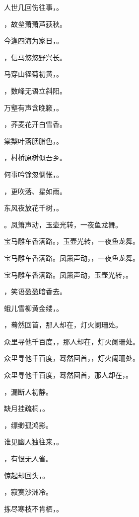 \documentclass[12pt, a4paper, addpoints, answers]{exam}
\begin{document}
\begin{questions}
\question[3] 人世几回伤往事，\fillin。

\question[3] \fillin，故垒萧萧芦荻秋。

\question[3] 今逢四海为家日，\fillin。

\question[3] \fillin，信马悠悠野兴长。

\question[3] 马穿山径菊初黄，\fillin。

\question[3] \fillin，数峰无语立斜阳。

\question[3] 万壑有声含晚籁，\fillin。

\question[3] \fillin，荞麦花开白雪香。

\question[3] 棠梨叶落胭脂色，\fillin。

\question[3] \fillin，村桥原树似吾乡。

\question[3] 何事吟馀忽惆怅，\fillin。

\question[3] \fillin，更吹落、星如雨。

\question[3] 东风夜放花千树，\fillin。

\question[3] \fillin。凤箫声动，玉壶光转，一夜鱼龙舞。

\question[3] 宝马雕车香满路。\fillin，玉壶光转，一夜鱼龙舞。

\question[3] 宝马雕车香满路。凤箫声动，\fillin，一夜鱼龙舞。

\question[3] 宝马雕车香满路。凤箫声动，玉壶光转，\fillin。

\question[3] \fillin，笑语盈盈暗香去。

\question[3] 蛾儿雪柳黄金缕，\fillin。

\question[3] \fillin，蓦然回首，那人却在，灯火阑珊处。

\question[3] 众里寻他千百度，\fillin，那人却在，灯火阑珊处。

\question[3] 众里寻他千百度，蓦然回首，\fillin，灯火阑珊处。

\question[3] 众里寻他千百度，蓦然回首，那人却在，\fillin。

\question[3] \fillin，漏断人初静。

\question[3] 缺月挂疏桐，\fillin。

\question[3] \fillin，缥缈孤鸿影。

\question[3] 谁见幽人独往来，\fillin。

\question[3] \fillin，有恨无人省。

\question[3] 惊起却回头，\fillin。

\question[3] \fillin，寂寞沙洲冷。

\question[3] 拣尽寒枝不肯栖，\fillin。


\end{questions}
\end{document}
